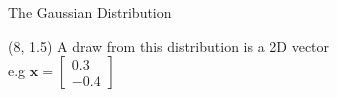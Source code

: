 \documentclass[pdf]{beamer}
\begin{document}
\begin{frame}{The Gaussian Distribution}
\begin{textblock}{8}(8, 1.5) %
\scriptsize
A draw from this distribution is a 2D vector\\
e.g $\mathbf{x}=\begin{bmatrix} 0.3 \\ -0.4 \end{bmatrix}$
\end{textblock}

\begin{center}
\end{center}
\end{frame}

\end{document}
